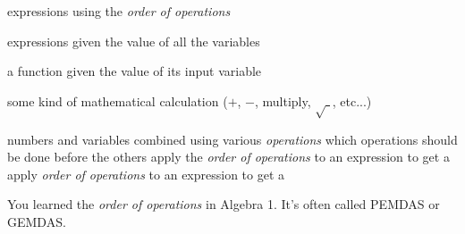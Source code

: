 \documentclass[fleqn,letterpaper,12pt,printwatermark=false]{memoir}
\begin{document}
\newcommand{\myClassName}{Pre-AP Algebra 2}
\newcommand{\myUnitNumber}{1}
\newcommand{\myUnitTitle}{Introduction to Functions}
\newcommand{\myLessonNumber}{4}
\newcommand{\myLessonTitle}{Evaluating Expressions and Functions}



\pagestyle{myPagestyle}

\checkandfixthelayout
{}

\begin{myNotesHeader}
    \item {} expressions using the \emph{order of operations}
    \item {} expressions given the value of all the variables
    \item {} a function given the value of its input variable
\end{myNotesHeader}

\begin{myVocabulary}
    {
        some kind of mathematical calculation
        ($+$, $-$, multiply, $\sqrt{\,\,}$, etc...)

    }
    {
        numbers and variables combined using various \emph{operations}
    }
    {
        which operations should be done before the others
    }
    {
        apply the \emph{order of operations} 
        to an expression to get a 
    }
    {
        apply \emph{order of operations} 
        to an expression to get a 
    }
\end{myVocabulary}

\begin{myLesson}[][]
    You learned the \emph{order of operations} in Algebra 1.
    It's often called PEMDAS or GEMDAS.
\end{myLesson}
\end{document}

